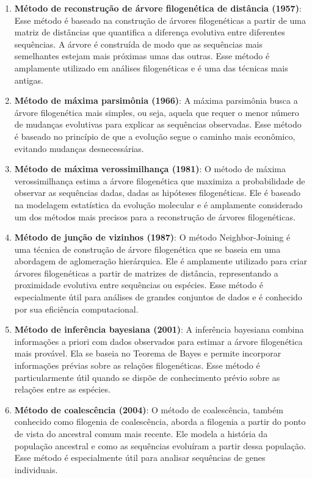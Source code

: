 \begin{enumerate}
  \item \textbf{Método de reconstrução de árvore filogenética de distância (1957)}: Esse método é baseado na construção de árvores filogenéticas a partir de uma matriz de distâncias que quantifica a diferença evolutiva entre diferentes sequências. A árvore é construída de modo que as sequências mais semelhantes estejam mais próximas umas das outras. Esse método é amplamente utilizado em análises filogenéticas e é uma das técnicas mais antigas.~\cite{sokal_statistical_method_1958}
  \item \textbf{Método de máxima parsimônia (1966)}: A máxima parsimônia busca a árvore filogenética mais simples, ou seja, aquela que requer o menor número de mudanças evolutivas para explicar as sequências observadas. Esse método é baseado no princípio de que a evolução segue o caminho mais econômico, evitando mudanças desnecessárias.~\cite{fitch_toward_definition_1971}
  \item \textbf{Método de máxima verossimilhança (1981)}: O método de máxima verossimilhança estima a árvore filogenética que maximiza a probabilidade de observar as sequências dadas, dadas as hipóteses filogenéticas. Ele é baseado na modelagem estatística da evolução molecular e é amplamente considerado um dos métodos mais precisos para a reconstrução de árvores filogenéticas.~\cite{felsenstein_evolutionary_tree_1981}
  \item \textbf{Método de junção de vizinhos (1987)}: O método Neighbor-Joining é uma técnica de construção de árvore filogenética que se baseia em uma abordagem de aglomeração hierárquica. Ele é amplamente utilizado para criar árvores filogenéticas a partir de matrizes de distância, representando a proximidade evolutiva entre sequências ou espécies. Esse método é especialmente útil para análises de grandes conjuntos de dados e é conhecido por sua eficiência computacional.~\cite{saitou_neighbor_1987} %
  \item \textbf{Método de inferência bayesiana (2001)}: A inferência bayesiana combina informações a priori com dados observados para estimar a árvore filogenética mais provável. Ela se baseia no Teorema de Bayes e permite incorporar informações prévias sobre as relações filogenéticas. Esse método é particularmente útil quando se dispõe de conhecimento prévio sobre as relações entre as espécies.~\cite{huelsenbeck_bayesian_inference_2001}
  \item \textbf{Método de coalescência (2004)}: O método de coalescência, também conhecido como filogenia de coalescência, aborda a filogenia a partir do ponto de vista do ancestral comum mais recente. Ele modela a história da população ancestral e como as sequências evoluíram a partir dessa população. Esse método é especialmente útil para analisar sequências de genes individuais.~\cite{kingman_coalescent_1982}

\end{enumerate}
